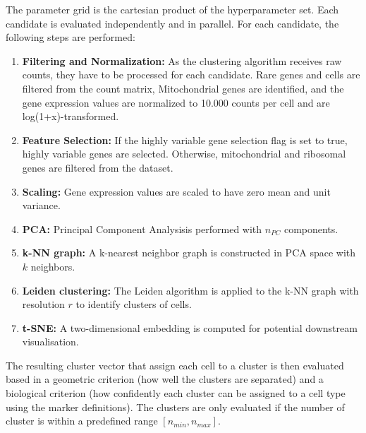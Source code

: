 \documentclass[11pt]{article}
\begin{document}
The parameter grid is the cartesian product of the hyperparameter set. Each candidate is evaluated independently and in parallel. For each candidate, the following steps are performed:
\begin{enumerate}
    \item \textbf{Filtering and Normalization:} As the clustering algorithm receives raw counts, they have to be processed for each candidate. Rare genes and cells are filtered from the count matrix, Mitochondrial genes are identified, and the gene expression values are normalized to 10.000 counts per cell and are log(1+x)-transformed. %
    \item \textbf{Feature Selection:} If the highly variable gene selection flag is set to true, highly variable genes are selected. Otherwise, mitochondrial and ribosomal genes are filtered from the dataset.
    \item \textbf{Scaling:} Gene expression values are scaled to have zero mean and unit variance.
    \item \textbf{PCA:} Principal Component Analysisis performed with $n_{PC}$ components.
    \item \textbf{k-NN graph:} A k-nearest neighbor graph is constructed in PCA space with $k$ neighbors.
    \item \textbf{Leiden clustering:} The Leiden algorithm is applied to the k-NN graph with resolution $r$ to identify clusters of cells.
    \item \textbf{t-SNE:} A two-dimensional embedding is computed for potential downstream visualisation.
\end{enumerate}

The resulting cluster vector that assign each cell to a cluster is then evaluated based in a geometric criterion (how well the clusters are separated) and a biological criterion (how confidently each cluster can be assigned to a cell type using the marker definitions). %
The clusters are only evaluated if the number of cluster is within a predefined range $[n_{min}, n_{max}]$.
\end{document}
